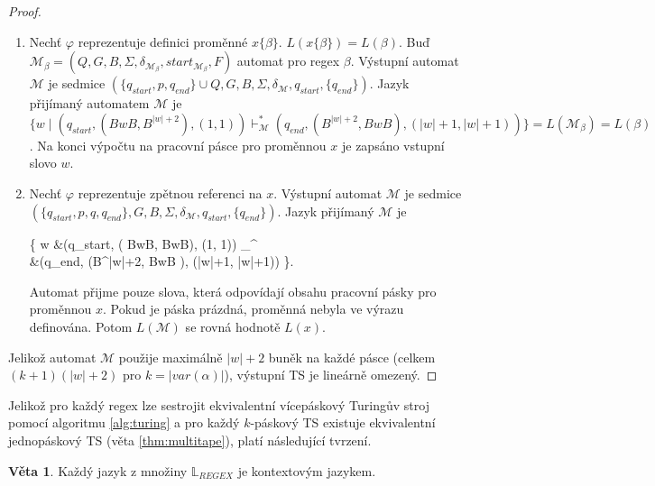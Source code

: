 \documentclass[thesis=B,czech]{FITthesis}[2019/12/23]
\theoremstyle{definition}
\newtheorem{theorem}{Věta}[chapter]
\begin{document}
\begin{proof}
\begin{enumerate}
{{		}
	}
	\item{Nechť $\varphi$ reprezentuje definici proměnné $x\{\beta\}$. $L(x\{\beta\})= L(\beta)$. Buď $\mathcal{M}_{\beta} = (Q, G, B, \Sigma, \delta_{\mathcal{M}_{\beta}}, start_{\mathcal{M}_{\beta}}, F)$ automat pro regex $\beta$. Výstupní automat $\mathcal{M}$ je sedmice $(\{q_{start}, p, q_{end}\}\cup Q, G, B, \Sigma, \delta_{\mathcal{M}}, q_{start}, \{q_{end}\})$. Jazyk přijímaný automatem $\mathcal{M}$ je $\{ w \mid \left(q_{start}, \left( BwB, B^{|w|+2}\right),  \left(1, 1\right)\right) \vdash_{\mathcal{M}}^\ast \left(q_{end}, \left(B^{|w|+2}, BwB \right),  \left(|w|+1, |w|+1 \right)\right) \} = L(\mathcal{M}_{\beta})= L(\beta)$. Na konci výpočtu na pracovní pásce pro proměnnou $x$ je zapsáno vstupní slovo $w$. 
	}
	\item{Nechť $\varphi$ reprezentuje zpětnou referenci na $x$. Výstupní automat $\mathcal{M}$ je sedmice $(\{q_{start}, p, q, q_{end}\}, G, B, \Sigma, \delta_{\mathcal{M}}, q_{start}, \{q_{end}\})$. Jazyk přijímaný $\mathcal{M}$ je \begin{flalign*}\{ w \mid &\left(q_{start}, \left( BwB, BwB\right),  \left(1, 1\right)\right) \vdash_{}^\ast \\&\left(q_{end}, \left(B^{|w|+2}, BwB \right),  (|w|+1, |w|+1)\right) \}.\end{flalign*} Automat přijme pouze slova, která odpovídají obsahu pracovní pásky pro proměnnou $x$. Pokud je páska prázdná, proměnná nebyla ve výrazu definována. Potom $L(\mathcal{M})$ se rovná hodnotě $L(x)$.}
\end{enumerate}
Jelikož automat $\mathcal{M}$ použije maximálně $|w|+2$ buněk na každé pásce (celkem $(k+1)(|w|+2)$ pro $k=|var(\alpha)|$), výstupní TS je lineárně omezený. 
\end{proof}

Jelikož pro každý regex lze sestrojit ekvivalentní vícepáskový Turingův stroj pomocí algoritmu \ref{alg:turing} a pro každý $k$-páskový TS existuje ekvivalentní jednopáskový TS (věta \ref{thm:multitape}), platí následující tvrzení.

\begin{theorem}
Každý jazyk z množiny $\mathbb{L}_{REGEX} $ je kontextovým jazykem.
\end{theorem} 
\end{document}
